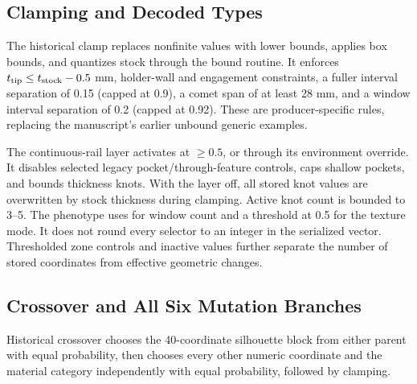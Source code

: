 \subsection{Clamping and Decoded Types}
The historical clamp replaces nonfinite values with lower bounds, applies box bounds, and quantizes stock through the bound  routine. It enforces $t_{\rm tip}\le t_{\rm stock}-0.5$ mm, holder-wall and engagement constraints, a fuller interval separation of 0.15 (capped at 0.9), a comet span of at least 28 mm, and a window interval separation of 0.2 (capped at 0.92). These are producer-specific rules, replacing the manuscript's earlier unbound generic examples.

The continuous-rail layer activates at  $\ge0.5$, or through its environment override. It disables selected legacy pocket/through-feature controls, caps shallow pockets, and bounds thickness knots. With the layer off, all stored knot values are overwritten by stock thickness during clamping. Active knot count is  bounded to 3--5. The phenotype uses  for window count and a threshold at 0.5 for the texture mode. It does not round every selector to an integer in the serialized vector. Thresholded zone controls and inactive values further separate the number of stored coordinates from effective geometric changes.

\subsection{Crossover and All Six Mutation Branches}
Historical crossover chooses the 40-coordinate silhouette block from either parent with equal probability, then chooses every other numeric coordinate and the material category independently with equal probability, followed by clamping.

